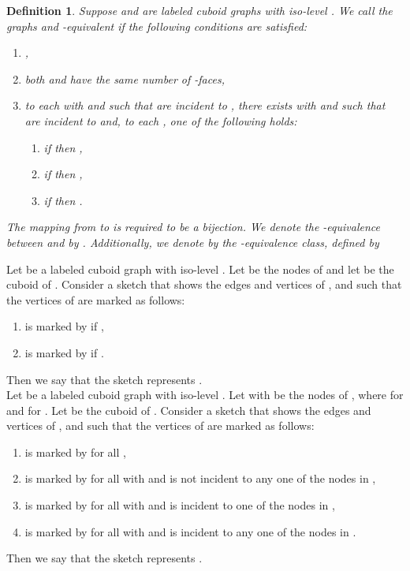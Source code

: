 \documentclass[a4paper,11pt]{article}
\newtheorem{definition}[theorem]{Definition}
\begin{document}
\begin{definition}
Suppose  and  are labeled cuboid graphs
with iso-level . We call the graphs  and  -equivalent if the following
conditions are satisfied:
\begin{enumerate}
\item[(i)] ,
\item[(ii)] both  and  have the same number of -faces,
\item[(iii)] to each  with  and  such that  are
incident to , there exists  with  and  such that
 are incident to  and, to each , one of the following holds:
  \begin{enumerate}
   \item[(a)] if  then ,
   \item[(b)] if  then ,
   \item[(c)] if  then .
  \end{enumerate}
\end{enumerate}
The mapping from  to  is required to be a bijection. We denote the -equivalence between 
and  by . Additionally, we denote by 
the -equivalence class, defined by

\label{def:equivalence-2}
\end{definition}
Let  be a labeled cuboid
graph with iso-level . Let  be the nodes of  and let   be the
cuboid of . Consider a sketch that shows the edges and vertices of , and such that the vertices
of  are marked as follows:
\begin{enumerate}
\item[(i)]  is marked by  if ,
\item[(ii)]  is marked by  if .
\end{enumerate}
Then we say that the sketch represents .\\

Let  be a labeled cuboid
graph with iso-level . Let  with 
be the nodes of , where  for 
and  for . Let  be the cuboid of . Consider a sketch
that shows the edges and vertices of , and such that the vertices of  are marked as follows:
\begin{enumerate}
\item[(i)]  is marked by  for all ,
\item[(ii)]  is marked by  for all  with 
and  is not incident to any one of the nodes in ,
\item[(iii)]  is marked by  for all  with 
and  is incident to one of the nodes in ,
\item[(iv)]   is marked by  for all  with 
and  is incident to any one of the nodes in .
\end{enumerate}
Then we say that the sketch represents .\\
\end{document}
